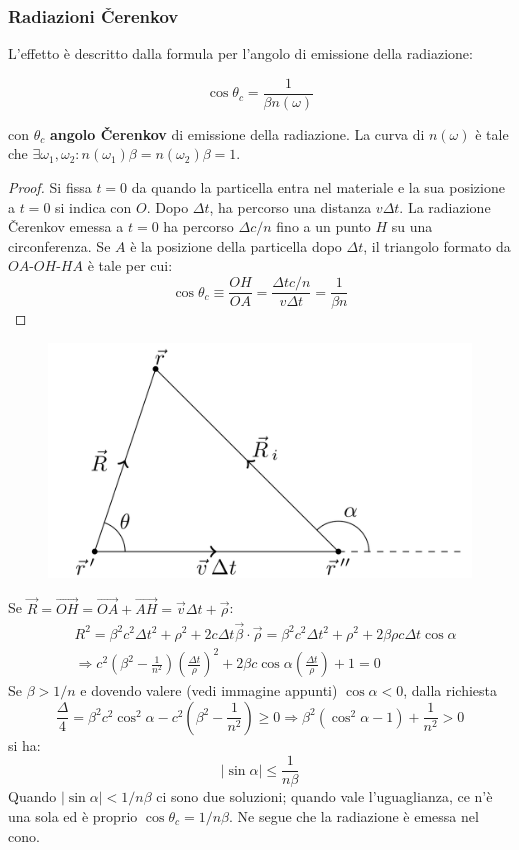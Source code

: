 \documentclass[10pt, a4paper]{scrartcl}
\numberwithin{equation}{subsection}
\theoremstyle{style1}
\newenvironment{boxenv}[1][]{
    \begin{eqbox}[#1]
    }{
   \end{eqbox}
}
\begin{document}
\subsubsection{Radiazioni \v Cerenkov}

L'effetto \`e descritto dalla formula per l'angolo di emissione della radiazione:
\begin{boxenv}[]
\begin{equation}
	\cos \theta _c = \frac{1}{ \beta  n(\omega)}
\end{equation}
\end{boxenv}
\noindent con $\theta _c$ \textbf{angolo \v Cerenkov} di emissione della radiazione. La curva di $n(\omega)$ \`e tale che $\exists \omega_1, \omega_2 : n(\omega_1) \beta = n(\omega_2)\beta  = 1$.
\begin{proof}
	Si fissa $t=0$ da quando la particella entra nel materiale e la sua posizione a $t=0$ si indica con $O$. Dopo $\Delta t$, ha percorso una distanza $v\Delta t $. La radiazione \v Cerenkov emessa a $t=0$ ha percorso $\Delta c / n$ fino a un punto $H$ su una circonferenza. Se $A$ \`e la posizione della particella dopo $\Delta  t$, il triangolo formato da $OA$-$OH$-$HA$ \`e tale per cui:
	\[
	\cos \theta  _c \equiv \frac{OH}{OA} = \frac{\Delta t c / n}{v \Delta  t} = \frac{1}{\beta  n}
	\] 
\end{proof}
\begin{figure}[h!]
	\centering
	\includegraphics[width=.4\columnwidth]{c2.png}
\end{figure}
\noindent Se $\vec{R} = \vec{OH} = \vec{OA}+\vec{AH}= \vec{v}\Delta  t + \vec{\rho }$:
\[
	\begin{split}
		&R^2 = \beta ^2 c^2 \Delta  t ^2 + \rho ^2 + 2c\Delta  t \vec{\beta }\cdot \vec{\rho }  = \beta ^2 c^2 \Delta t^2 + \rho ^2 + 2 \beta  \rho  c \Delta  t \cos \alpha \\
		&\Rightarrow c^2 \left(\beta ^2 - \frac{1}{n^2}\right) \left(\frac{\Delta  t}{\rho }\right) ^2 + 2 \beta  c \cos \alpha  \left(\frac{\Delta  t}{\rho }\right) +1 = 0
	\end{split}
\] 
Se $\beta  > 1 / n$ e dovendo valere (vedi immagine appunti) $\cos \alpha  < 0$, dalla richiesta
\[
\frac{\Delta }{4} = \beta ^2 c^2 \cos^2 \alpha  - c^2 \left(\beta ^2 - \frac{1}{n^2}\right) \ge 0\Rightarrow \beta ^2 (\cos^2 \alpha  -1) + \frac{1}{n^2}>0
\] 
si ha:
\begin{equation}
	\left\lvert \sin \alpha  \right\rvert \le \frac{1}{n \beta }
\end{equation}
Quando $\left\lvert \sin \alpha  \right\rvert < 1 / n\beta $ ci sono due soluzioni; quando vale l'uguaglianza, ce n'\`e una sola ed \`e proprio $\cos \theta _c = 1 / n\beta $. Ne segue che la radiazione \`e emessa nel cono.
\end{document}
